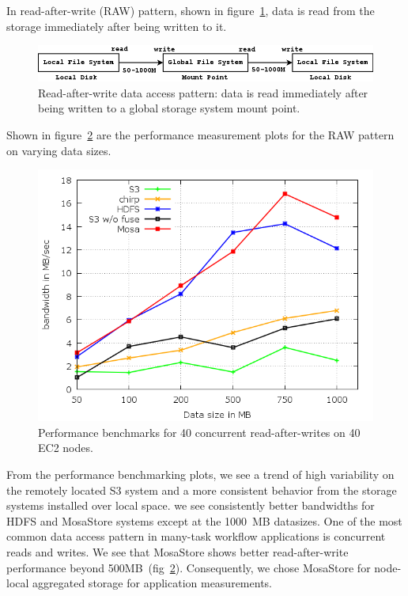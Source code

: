 \documentclass[10pt,journal,cspaper,compsoc]{IEEEtran}
\begin{document}
In read-after-write (RAW)
pattern, shown in figure~\ref{fig:raw}, data is read from the storage
immediately after being written to it. 
%
\begin{figure}[htb]
\begin{center}
\includegraphics[width=13cm]{figures/raw.png}
\caption{Read-after-write data access pattern: data is read immediately after being written to a global storage system mount point.
\label{fig:raw}
}
\end{center}
\end{figure}
%
Shown in figure~\ref{fig:raw_perf} are the performance measurement plots for the RAW pattern on varying data sizes.
%
\begin{figure}[htb]
\begin{center}
\includegraphics[width=\linewidth]{plots/RAW-bw.png}
\caption{Performance benchmarks for 40 concurrent read-after-writes on 40 EC2 nodes.
\label{fig:raw_perf}
}
\end{center}
\end{figure}
%
From the performance benchmarking plots, we see a trend of high variability on
the remotely located S3 system and a more consistent behavior from the storage
systems installed over local space. we see  consistently better bandwidths for
HDFS and MosaStore systems except at the 1000~MB datasizes. One of the most
common data access pattern in many-task workflow applications is concurrent
reads and writes. We see that MosaStore shows better read-after-write
performance beyond 500MB~(fig~\ref{fig:raw_perf}). Consequently, we chose
MosaStore for node-local aggregated storage for application measurements.
\end{document}
